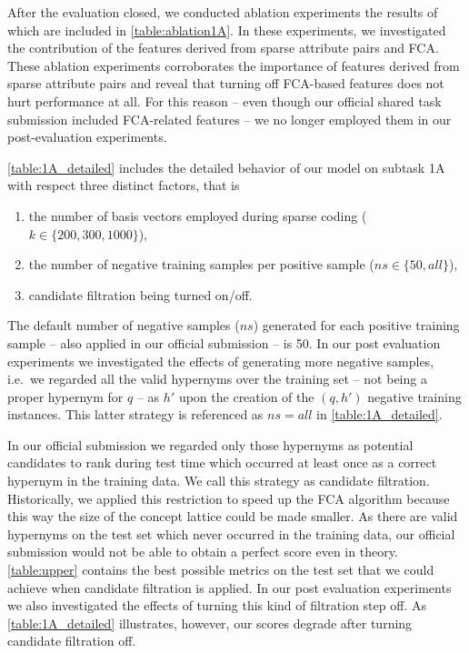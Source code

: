 \documentclass[11pt,a4paper]{article}
\begin{document}




After the evaluation closed, we conducted ablation experiments the results of 
which are included in
\autoref{table:ablation1A}. In these experiments, we investigated the 
contribution of the features derived from sparse attribute pairs and FCA.
These ablation experiments corroborates the importance of features derived 
from sparse attribute pairs and reveal that turning off FCA-based features 
does not hurt performance at all. For this reason -- even though our official 
shared task submission included FCA-related features -- we no longer employed 
them in our post-evaluation experiments.

\autoref{table:1A_detailed} includes the detailed behavior of our model on 
subtask 1A with respect three distinct factors, that is
\begin{enumerate}
	\item the number of basis vectors employed during sparse coding ($k \in 
	\{200, 300, 1000\}$),
	\item the number of negative training samples per positive sample ($ns 
	\in \{50, all\}$),
	\item candidate filtration being turned on/off.
\end{enumerate}
The default number of negative samples ($ns$) generated for
each positive training sample -- also applied in our official submission -- is 
50. In our post evaluation experiments we investigated the effects of 
generating more negative samples, i.e.~we regarded all the valid hypernyms over 
the training set -- not being a
proper hypernym for $q$ -- as $h'$ upon the creation of the $(q, h')$ negative 
training instances. This latter strategy is referenced as $ns=all$ in 
\autoref{table:1A_detailed}.

In our official submission we regarded only those hypernyms as potential 
candidates to rank during test time which occurred at least once as a correct 
hypernym in the training data. We call this strategy as candidate filtration. 
Historically, we applied this restriction to speed up the FCA algorithm because 
this way the size of the concept lattice could be made smaller.
As there are valid hypernyms on the test set which never occurred in the 
training data, our official submission would not be able to obtain a perfect 
score even in theory. \autoref{table:upper} contains the best possible metrics 
on the test set that we could achieve when candidate filtration is applied. In 
our post evaluation experiments we also investigated the effects of turning 
this kind of filtration step off. As \autoref{table:1A_detailed} illustrates, 
however, our scores degrade after turning candidate filtration off.
\end{document}
